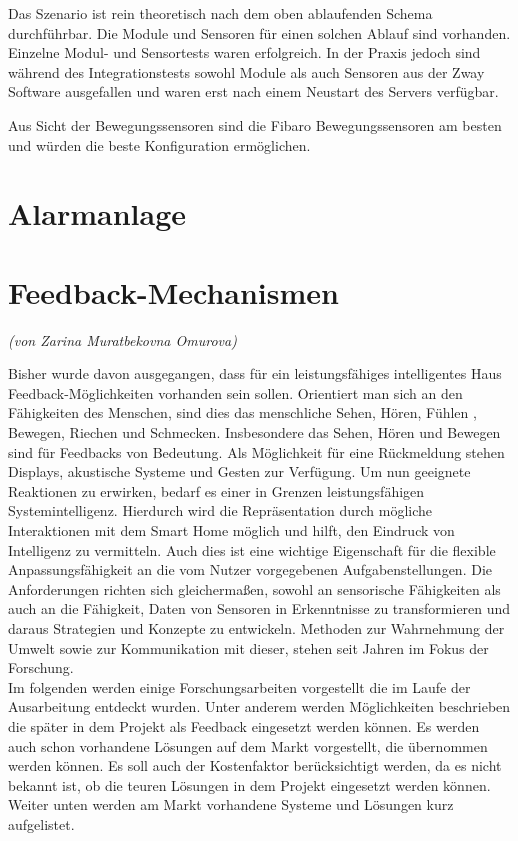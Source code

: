Das Szenario ist rein theoretisch nach dem oben ablaufenden Schema durchführbar. Die Module und Sensoren für einen solchen Ablauf sind vorhanden. Einzelne Modul- und Sensortests waren erfolgreich.
In der Praxis jedoch sind während des Integrationstests sowohl Module als auch Sensoren aus der Zway Software ausgefallen und waren erst nach einem Neustart des Servers verfügbar.

Aus Sicht der Bewegungssensoren sind die Fibaro Bewegungssensoren am besten und würden die beste Konfiguration ermöglichen.


\section{Alarmanlage}

\newpage
\section{Feedback-Mechanismen}
\label{sec:feedbackMechanismen}
\emph{(von Zarina Muratbekovna Omurova)}

\noindent
Bisher wurde davon ausgegangen, dass für ein leistungsfähiges intelligentes Haus Feedback-Möglichkeiten vorhanden sein sollen. Orientiert man sich an den Fähigkeiten des Menschen, sind dies das menschliche Sehen, Hören, Fühlen , Bewegen, Riechen und Schmecken. Insbesondere das Sehen, Hören und Bewegen sind für Feedbacks von Bedeutung. Als Möglichkeit für eine Rückmeldung stehen Displays, akustische Systeme und Gesten zur Verfügung. Um nun geeignete Reaktionen zu erwirken, bedarf es einer in Grenzen leistungsfähigen Systemintelligenz. Hierdurch wird die Repräsentation durch mögliche Interaktionen mit dem Smart Home möglich und hilft, den Eindruck von \glqq Intelligenz\grqq{} zu vermitteln. Auch dies ist eine wichtige Eigenschaft für die flexible Anpassungsfähigkeit an die vom Nutzer vorgegebenen Aufgabenstellungen. Die Anforderungen richten sich gleichermaßen, sowohl an sensorische Fähigkeiten als auch an die Fähigkeit, Daten von Sensoren in Erkenntnisse zu transformieren und daraus Strategien und Konzepte zu entwickeln. Methoden zur Wahrnehmung der Umwelt sowie zur Kommunikation mit dieser, stehen seit Jahren im Fokus der Forschung.\\
Im folgenden werden einige Forschungsarbeiten vorgestellt die im Laufe der Ausarbeitung entdeckt wurden. Unter anderem werden Möglichkeiten beschrieben die später in dem Projekt als Feedback eingesetzt werden können. Es werden auch schon vorhandene Lösungen auf dem Markt vorgestellt, die übernommen werden können. Es soll auch der Kostenfaktor berücksichtigt werden, da es nicht bekannt ist, ob die teuren Lösungen in dem Projekt eingesetzt werden können.\\
Weiter unten werden am Markt vorhandene Systeme und Lösungen kurz aufgelistet.\\

